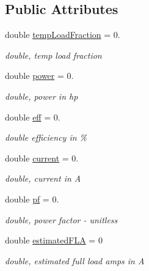 \subsection*{Public Attributes}
\begin{DoxyCompactItemize}
\item 
\mbox{\label{class_motor_shaft_power_ae507fdb9ee1332f1058710168bc9a90c}} 
double \hyperlink{class_motor_shaft_power_ae507fdb9ee1332f1058710168bc9a90c}{temp\+Load\+Fraction} = 0.
\begin{DoxyCompactList}\small\item\em double, temp load fraction \end{DoxyCompactList}\item 
\mbox{\label{class_motor_shaft_power_ad2d47aeac567a2049fa51d2bd653a122}} 
double \hyperlink{class_motor_shaft_power_ad2d47aeac567a2049fa51d2bd653a122}{power} = 0.
\begin{DoxyCompactList}\small\item\em double, power in hp \end{DoxyCompactList}\item 
\mbox{\label{class_motor_shaft_power_a3dcd3d5c1dc3e3712fa4d16431ed270b}} 
double \hyperlink{class_motor_shaft_power_a3dcd3d5c1dc3e3712fa4d16431ed270b}{eff} = 0.
\begin{DoxyCompactList}\small\item\em double efficiency in \% \end{DoxyCompactList}\item 
\mbox{\label{class_motor_shaft_power_a675d8994d4a90951f313ca18b1c63cae}} 
double \hyperlink{class_motor_shaft_power_a675d8994d4a90951f313ca18b1c63cae}{current} = 0.
\begin{DoxyCompactList}\small\item\em double, current in A \end{DoxyCompactList}\item 
\mbox{\label{class_motor_shaft_power_a53bc7d404b5db7a5a5fe343e200948c6}} 
double \hyperlink{class_motor_shaft_power_a53bc7d404b5db7a5a5fe343e200948c6}{pf} = 0.
\begin{DoxyCompactList}\small\item\em double, power factor -\/ unitless \end{DoxyCompactList}\item 
\mbox{\label{class_motor_shaft_power_a56bbded3394ee729ac3480c0f773cbb9}} 
double \hyperlink{class_motor_shaft_power_a56bbded3394ee729ac3480c0f773cbb9}{estimated\+F\+LA} = 0
\begin{DoxyCompactList}\small\item\em double, estimated full load amps in A \end{DoxyCompactList}\end{DoxyCompactItemize}


